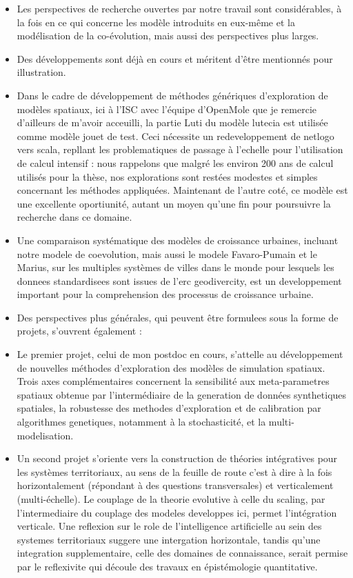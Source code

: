 \documentclass[11pt]{article}
\begin{document}
\begin{itemize}
	\item Les perspectives de recherche ouvertes par notre travail sont considérables, à la fois en ce qui concerne les modèle introduits en eux-même et la modélisation de la co-évolution, mais aussi des perspectives plus larges.
	\item Des développements sont déjà en cours et méritent d'être mentionnés pour illustration.
	\item Dans le cadre de développement de méthodes génériques d'exploration de modèles spatiaux, ici à l'ISC avec l'équipe d'OpenMole que je remercie d'ailleurs de m'avoir acceuilli, la partie Luti du modèle lutecia est utilisée comme modèle jouet de test. Ceci nécessite un redeveloppement de netlogo vers scala, repllant les problematiques de passage à l'echelle pour l'utilisation de calcul intensif : nous rappelons que malgré les environ 200 ans de calcul utilisés pour la thèse, nos explorations sont restées modestes et simples concernant les méthodes appliquées. Maintenant de l'autre coté, ce modèle est une excellente oportiunité, autant un moyen qu'une fin pour poursuivre la recherche dans ce domaine.
	\item Une comparaison systématique des modèles de croissance urbaines, incluant notre modele de coevolution, mais aussi le modele Favaro-Pumain et le Marius, sur les multiples systèmes de villes dans le monde pour lesquels les donnees standardisees sont issues de l'erc geodivercity, est un developpement important pour la comprehension des processus de croissance urbaine.
	\item Des perspectives plus générales, qui peuvent être formulees sous la forme de projets, s'ouvrent également :
	\item Le premier projet, celui de mon postdoc en cours, s'attelle au développement de nouvelles méthodes d'exploration des modèles de simulation spatiaux. Trois axes complémentaires concernent la sensibilité aux meta-parametres spatiaux obtenue par l'intermédiaire de la generation de données synthetiques spatiales, la robustesse des methodes d'exploration et de calibration par algorithmes genetiques, notamment à la stochasticité, et la multi-modelisation.
	\item Un second projet s'oriente vers la construction de théories intégratives pour les systèmes territoriaux, au sens de la feuille de route c'est à dire à la fois horizontalement (répondant à des questions transversales) et verticalement (multi-échelle). Le couplage de la theorie evolutive à celle du scaling, par l'intermediaire du couplage des modeles developpes ici, permet l'intégration verticale. Une reflexion sur le role de l'intelligence artificielle au sein des systemes territoriaux suggere une intergation horizontale, tandis qu'une integration supplementaire, celle des domaines de connaissance, serait permise par le reflexivite qui découle des travaux en épistémologie quantitative.
\end{itemize}
\end{document}
